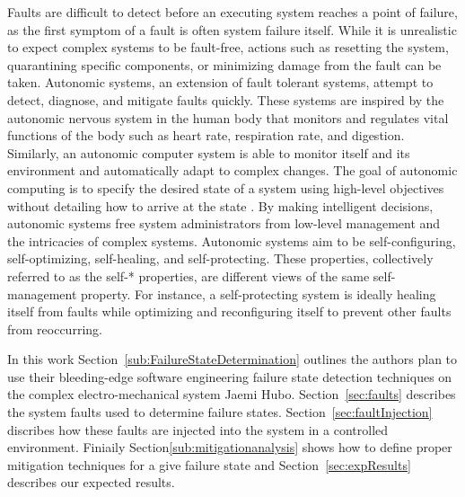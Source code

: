 Faults are difficult to detect before an executing system reaches a point of
failure, as the first symptom of a fault is often system failure itself. While
it is unrealistic to expect complex systems to be fault-free, actions such as
resetting the system, quarantining specific components, or minimizing damage
from the fault can be taken. Autonomic systems, an extension of fault tolerant
systems, attempt to detect, diagnose, and mitigate faults quickly. These
systems are inspired by the autonomic nervous system in the human body that
monitors and regulates vital functions of the body such as heart rate,
respiration rate, and digestion. Similarly, an autonomic computer system is
able to monitor itself and its environment and automatically adapt to complex
changes. The goal of autonomic computing is to specify the desired state of a
system using high-level objectives without detailing how to arrive at the state
\cite{1160055,4061119,1301340}. By making intelligent decisions, autonomic
systems free system administrators from low-level management and the
intricacies of complex systems. Autonomic systems aim to be self-configuring,
self-optimizing, self-healing, and self-protecting. These properties,
collectively referred to as the self-* properties, are different views of the
same self-man\-age\-ment property. For instance, a self-protecting system is
ideally healing itself from faults while optimizing and reconfiguring itself to
prevent other faults from reoccurring.


In this work Section~\ref{sub:FailureStateDetermination} outlines the authors
plan to use their bleeding-edge software engineering failure state detection
techniques on the complex electro-mechanical system Jaemi Hubo.
Section~\ref{sec:faults} describes the system faults used to determine failure
states.  Section~\ref{sec:faultInjection} discribes how these faults are
injected into the system in a controlled environment.  Finiaily
Section\ref{sub:mitigationanalysis} shows how to define proper mitigation
techniques for a give failure state and Section~\ref{sec:expResults} describes
our expected results.

